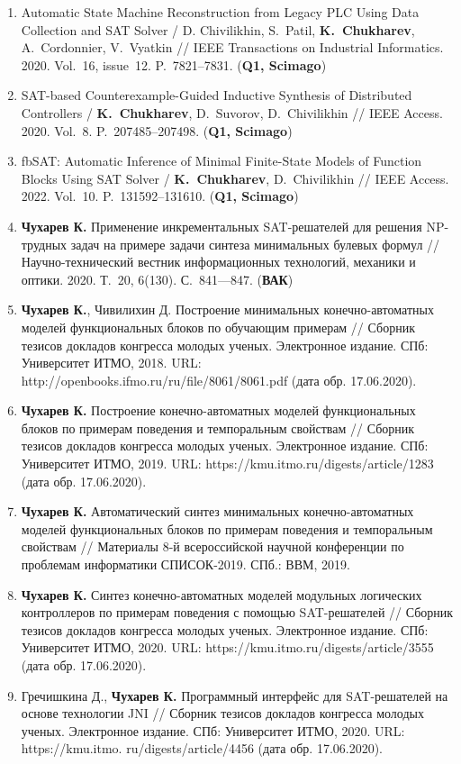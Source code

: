 \begin{enumerate}[left=0pt]
    \item Automatic State Machine Reconstruction from Legacy PLC Using Data Collection and SAT Solver / D. Chivilikhin, S.~Patil, \textbf{K.~Chukharev}, A.~Cordonnier, V.~Vyatkin // IEEE Transactions on Industrial Informatics. 2020. Vol.~16, issue~12. P.~7821–7831. (\textbf{Q1, Scimago})
    \item SAT-based Counterexample-Guided Inductive Synthesis of Distributed Controllers / \textbf{K.~Chukharev}, D.~Suvorov, D.~Chivilikhin // IEEE Access. 2020. Vol.~8. P.~207485–207498. (\textbf{Q1, Scimago})
    \item fbSAT: Automatic Inference of Minimal Finite-State Models of Function Blocks Using SAT Solver / \textbf{K.~Chukharev}, D.~Chivilikhin // IEEE Access. 2022. Vol.~10. P.~131592–131610. (\textbf{Q1, Scimago})
    \item \textbf{Чухарев К.} Применение инкрементальных SAT-решателей для решения NP-трудных задач на примере задачи синтеза минимальных булевых формул // Научно-технический вестник информационных технологий, механики и оптики. 2020. Т.~20, 6(130). С.~841—847. (\textbf{ВАК})
    \item \textbf{Чухарев К.}, Чивилихин Д. Построение минимальных конечно-автоматных моделей функциональных блоков по обучающим примерам // Сборник тезисов докладов конгресса молодых ученых. Электронное издание. СПб: Университет ИТМО, 2018. URL: http://openbooks.ifmo.ru/ru/file/8061/8061.pdf (дата обр. 17.06.2020).
    \item \textbf{Чухарев К.} Построение конечно-автоматных моделей функциональных блоков по примерам поведения и темпоральным свойствам // Сборник тезисов докладов конгресса молодых ученых. Электронное издание. СПб: Университет ИТМО, 2019. URL: https://kmu.itmo.ru/digests/article/1283 (дата обр. 17.06.2020).
    \item \textbf{Чухарев К.} Автоматический синтез минимальных конечно-автоматных моделей функциональных блоков по примерам поведения и темпоральным свойствам // Материалы 8-й всероссийской научной конференции по проблемам информатики СПИСОК-2019. СПб.: ВВМ, 2019.
    \item \textbf{Чухарев К.} Синтез конечно-автоматных моделей модульных логических контроллеров по примерам поведения с помощью SAT-решателей // Сборник тезисов докладов конгресса молодых ученых. Электронное издание. СПб: Университет ИТМО, 2020. URL: https://kmu.itmo.ru/digests/article/3555 (дата обр. 17.06.2020).
    \item Гречишкина Д., \textbf{Чухарев К.} Программный интерфейс для SAT-решателей на основе технологии JNI // Сборник тезисов докладов конгресса молодых ученых. Электронное издание. СПб: Университет ИТМО, 2020. URL: https://kmu.itmo. ru/digests/article/4456 (дата обр. 17.06.2020).
\end{enumerate}

